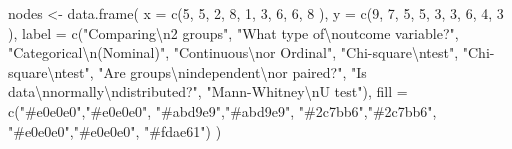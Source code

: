 \documentclass[
  12pt,
  letterpaper,
]{book}
\newenvironment{Shaded}{\begin{snugshade}}{\end{snugshade}}
\newcommand{\AttributeTok}[1]{\textcolor[rgb]{0.40,0.45,0.13}{#1}}
\newcommand{\DecValTok}[1]{\textcolor[rgb]{0.68,0.00,0.00}{#1}}
\newcommand{\FunctionTok}[1]{\textcolor[rgb]{0.28,0.35,0.67}{#1}}
\newcommand{\NormalTok}[1]{\textcolor[rgb]{0.00,0.23,0.31}{#1}}
\newcommand{\OtherTok}[1]{\textcolor[rgb]{0.00,0.23,0.31}{#1}}
\newcommand{\SpecialCharTok}[1]{\textcolor[rgb]{0.37,0.37,0.37}{#1}}
\newcommand{\StringTok}[1]{\textcolor[rgb]{0.13,0.47,0.30}{#1}}
\begin{document}
\begin{Shaded}
\begin{Highlighting}[]
\NormalTok{nodes }\OtherTok{\textless{}{-}} \FunctionTok{data.frame}\NormalTok{(}
  \AttributeTok{x     =} \FunctionTok{c}\NormalTok{(}\DecValTok{5}\NormalTok{,   }\DecValTok{5}\NormalTok{,   }\DecValTok{2}\NormalTok{,   }\DecValTok{8}\NormalTok{,   }\DecValTok{1}\NormalTok{,   }\DecValTok{3}\NormalTok{,   }\DecValTok{6}\NormalTok{,   }\DecValTok{6}\NormalTok{,   }\DecValTok{8}\NormalTok{  ),}
  \AttributeTok{y     =} \FunctionTok{c}\NormalTok{(}\DecValTok{9}\NormalTok{,   }\DecValTok{7}\NormalTok{,   }\DecValTok{5}\NormalTok{,   }\DecValTok{5}\NormalTok{,   }\DecValTok{3}\NormalTok{,   }\DecValTok{3}\NormalTok{,   }\DecValTok{6}\NormalTok{,   }\DecValTok{4}\NormalTok{,   }\DecValTok{3}\NormalTok{  ),}
  \AttributeTok{label =} \FunctionTok{c}\NormalTok{(}\StringTok{"Comparing}\SpecialCharTok{\textbackslash{}n}\StringTok{2 groups"}\NormalTok{,}
            \StringTok{"What type of}\SpecialCharTok{\textbackslash{}n}\StringTok{outcome variable?"}\NormalTok{,}
            \StringTok{"Categorical}\SpecialCharTok{\textbackslash{}n}\StringTok{(Nominal)"}\NormalTok{,}
            \StringTok{"Continuous}\SpecialCharTok{\textbackslash{}n}\StringTok{or Ordinal"}\NormalTok{,}
            \StringTok{"Chi{-}square}\SpecialCharTok{\textbackslash{}n}\StringTok{test"}\NormalTok{,}
            \StringTok{"Chi{-}square}\SpecialCharTok{\textbackslash{}n}\StringTok{test"}\NormalTok{,}
            \StringTok{"Are groups}\SpecialCharTok{\textbackslash{}n}\StringTok{independent}\SpecialCharTok{\textbackslash{}n}\StringTok{or paired?"}\NormalTok{,}
            \StringTok{"Is data}\SpecialCharTok{\textbackslash{}n}\StringTok{normally}\SpecialCharTok{\textbackslash{}n}\StringTok{distributed?"}\NormalTok{,}
            \StringTok{"Mann{-}Whitney}\SpecialCharTok{\textbackslash{}n}\StringTok{U test"}\NormalTok{),}
  \AttributeTok{fill  =} \FunctionTok{c}\NormalTok{(}\StringTok{"\#e0e0e0"}\NormalTok{,}\StringTok{"\#e0e0e0"}\NormalTok{,}
            \StringTok{"\#abd9e9"}\NormalTok{,}\StringTok{"\#abd9e9"}\NormalTok{,}
            \StringTok{"\#2c7bb6"}\NormalTok{,}\StringTok{"\#2c7bb6"}\NormalTok{,}
            \StringTok{"\#e0e0e0"}\NormalTok{,}\StringTok{"\#e0e0e0"}\NormalTok{,}
            \StringTok{"\#fdae61"}\NormalTok{)}
\NormalTok{)}


\end{Highlighting}
\end{Shaded}
\end{document}
